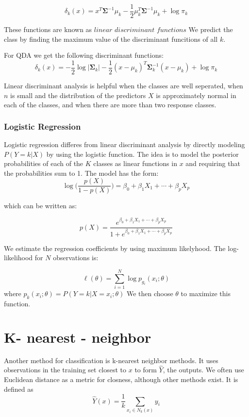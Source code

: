 \documentclass[12pt,twoside]{reedthesis}
\theoremstyle{definition}
\theoremstyle{definition}
\theoremstyle{definition}
\theoremstyle{remark}
\begin{document}
\[ \delta_k(x) = x^T\mathbf{\Sigma}^{-1}\mu_k - \frac{1}{2}\mu_k^T\mathbf{\Sigma}^{-1}\mu_k + \log \pi_k \]

These functions are known as \(\textit{linear discriminant functions}\)
We predict the class by finding the maximum value of the discriminant
funcitions of all \(k\).

For QDA we get the following discriminant functions:
\[ \delta_k(x) = -\frac{1}{2}\log|\mathbf{\Sigma}_k| - \frac{1}{2}(x - \mu_k)^T\mathbf{\Sigma}_k^{-1}(x - \mu_k) + \log \pi_k \]

Linear discriminant analysis is helpful when the classes are well
seperated, when \(n\) is small and the distribution of the predictors
\(X\) is approximately normal in each of the classes, and when there are
more than two response classes.

\subsubsection{Logistic Regression}\label{logistic-regression}

Logistic regression differes from linear discriminant analysis by
directly modeling \(P(Y = k|X)\) by using the logistic function. The
idea is to model the posterior probabilities of each of the \(K\)
classes as linear functions in \(x\) and requiring that the
probabilities sum to 1. The model has the form:
\[ \log \bigg( \frac{p(X)}{1-p(X)} \bigg) = \beta_0 + \beta_1 X_1 + \cdots + \beta_pX_p\]

which can be written as:

\[ p(X) = \frac{e^{\beta_0 + \beta_1X_1 + \cdots + \beta_pX_p}}{1 +e^{\beta_0 + \beta_1X_1 + \cdots + \beta_pX_p} }\]

We estimate the regression coefficients by using maximum likelyhood. The
log-likelihood for \(N\) observations is:

\[ \ell(\theta) = \sum_{i = 1}^N \log p_{g_i}(x_i;\theta)\] where
\(p_k(x_i;\theta) = P(Y = k|X = x_i;\theta)\) We then choose \(\theta\)
to maximize this function.

\section{K- nearest - neighbor}\label{k--nearest---neighbor}

Another method for classification is k-nearest neighbor methods. It uses
observations in the training set closest to \(x\) to form \(\hat{Y}\),
the outputs. We often use Euclidean distance as a metric for closness,
although other methods exist. It is defined as
\[ \hat{Y}(x) = \frac{1}{k}\sum_{x_i \in N_k(x)}y_i\]
\end{document}
